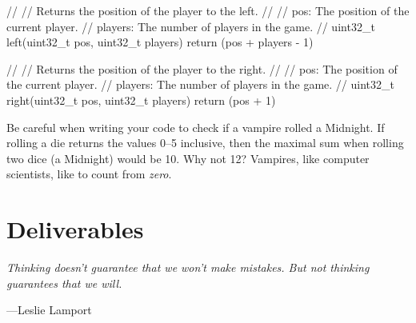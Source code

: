 \documentclass[11pt]{article}
\begin{document}
\begin{codelisting}{}
//
// Returns the position of the player to the left.
//
// pos: The position of the current player.
// players: The number of players in the game.
//
uint32_t left(uint32_t pos, uint32_t players) {
  return (pos + players - 1) %
}

//
// Returns the position of the player to the right.
//
// pos: The position of the current player.
// players: The number of players in the game.
//
uint32_t right(uint32_t pos, uint32_t players) {
  return (pos + 1) %
}
\end{codelisting}

Be careful when writing your code to check if a vampire rolled a Midnight. If
rolling a die returns the values 0--5 inclusive, then the maximal sum when
rolling two dice (a Midnight) would be 10. Why not 12? Vampires, like computer
scientists, like to count from \emph{zero}.
\vspace{20pt} %

\section{Deliverables}

\epigraph{\emph{Thinking doesn't guarantee that we won't make mistakes. But
not thinking guarantees that we will.}}{---Leslie Lamport}
\end{document}
